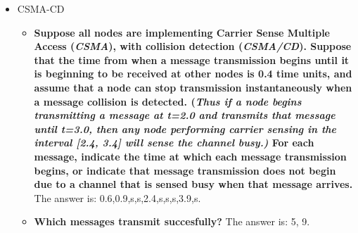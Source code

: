 \begin{itemize}
        \item CSMA-CD
        \begin{itemize}
            \item\textbf{Suppose all nodes are implementing Carrier Sense Multiple Access (\textit{CSMA}), with collision detection (\textit{CSMA/CD}). Suppose that
            the time from when a message transmission begins until it is beginning to be received at other nodes is 0.4 time units, and assume that a node can stop transmission
            instantaneously when a message collision is detected. (\textit{Thus if a node begins transmitting a message at t=2.0 and transmits that message until t=3.0, then
            any node performing carrier sensing in the interval [2.4, 3.4] will sense the channel busy.)} For each message, indicate the time at which each message
            transmission begins, or indicate that message transmission does not begin due to a channel that is sensed busy when that message arrives.}
            The answer is: 0.6,0.9,s,s,2.4,s,s,s,3.9,s.
            \item\textbf{Which messages transmit succesfully?} The answer is: 5, 9.
        \end{itemize}
    \end{itemize}

